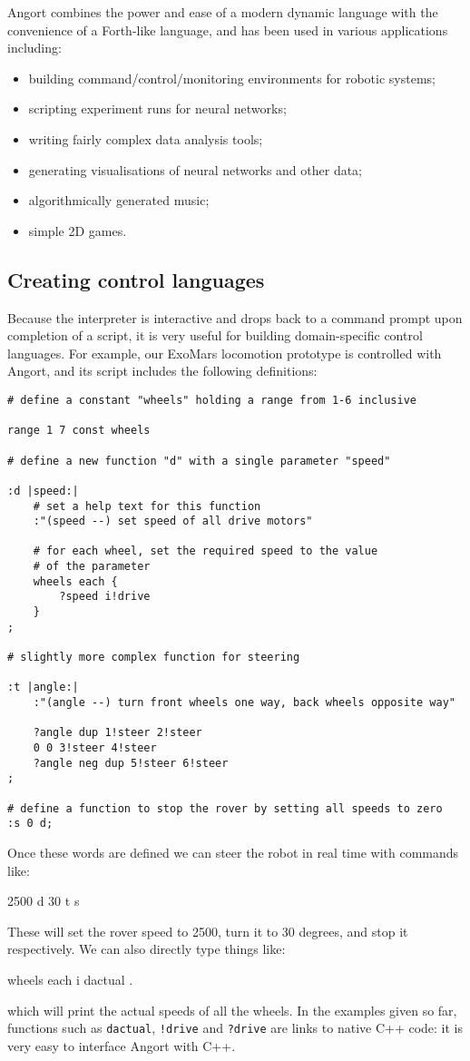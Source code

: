 Angort combines the power and ease of a modern dynamic language with
the convenience of a Forth-like language, and has been used
in various applications including:
\begin{itemize}
\item building command/control/monitoring environments for robotic
systems;
\item scripting experiment runs for neural networks;
\item writing fairly complex data analysis tools;
\item generating visualisations of neural networks and other data;
\item algorithmically generated music;
\item simple 2D games.
\end{itemize}
\clearpage  
\subsection{Creating control languages}
Because the interpreter is interactive and drops back to a command prompt
upon completion of a script, it is very useful
for building domain-specific control languages. For example, 
our ExoMars locomotion prototype is controlled with Angort, and
its script includes the following definitions:
\begin{lstlisting}
# define a constant "wheels" holding a range from 1-6 inclusive

range 1 7 const wheels

# define a new function "d" with a single parameter "speed"

:d |speed:|
    # set a help text for this function
    :"(speed --) set speed of all drive motors"

    # for each wheel, set the required speed to the value
    # of the parameter
    wheels each {
        ?speed i!drive
    }
;

# slightly more complex function for steering

:t |angle:|
    :"(angle --) turn front wheels one way, back wheels opposite way"
    
    ?angle dup 1!steer 2!steer
    0 0 3!steer 4!steer
    ?angle neg dup 5!steer 6!steer
;

# define a function to stop the rover by setting all speeds to zero
:s 0 d;
\end{lstlisting}
Once these words are defined we can steer the robot in real time with
commands like:
\begin{v}
2500 d
30 t
s
\end{v}
These will set the rover speed to 2500, turn it to 30 degrees, and stop
it respectively. We can also directly type things like:
\begin{v}
wheels each { i dactual .}
\end{v}
which will print the actual speeds of all the wheels.
In the examples given so far, functions such as \texttt{dactual},
\texttt{!drive} and \texttt{?drive} are links to native C++ code: it
is very easy to interface Angort with C++.


